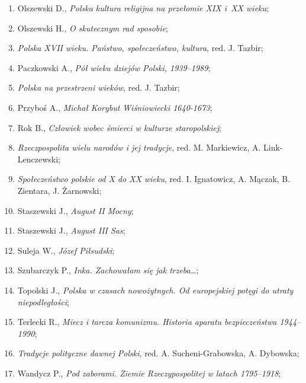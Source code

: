 \documentclass[a4paper,11pt]{article}
\begin{document}
\begin{enumerate}
\item Olszewski D., \textit{Polska kultura religijna na przełomie XIX
    i~XX wieku};

\item Olszewski H., \textit{O skutecznym rad sposobie};

\item \textit{Polska XVII wieku. Państwo, społeczeństwo, kultura}, red.
  J. Tazbir;

\item Paczkowski A., \textit{Pół wieku dziejów Polski, 1939--1989};

\item \textit{Polska na przestrzeni wieków}, red. J. Tazbir;

\item Przyboś A., \textit{Michał Korybut Wiśniowiecki 1640-1673};

\item Rok B., \textit{Człowiek wobec śmierci w kulturze staropolskiej};

\item \textit{Rzeczpospolita wielu narodów i jej tradycje}, red. M.
  Markiewicz, A. Link-Lenczewski;

\item \textit{Społeczeństwo polskie od X do XX wieku}, red. I.
  Ignatowicz, A. Mączak, B. Zientara, J. Żarnowski;

\item Staszewski J., \textit{August II Mocny};

\item Staszewski J., \textit{August III Sas};

\item Suleja W., \textit{Józef Piłsudski};

\item Szubarczyk P., \textit{Inka. Zachowałam się jak trzeba\ldots};

\item Topolski J., \textit{Polska w czasach nowożytnych. Od europejskiej
    potęgi do utraty niepodległości};

\item Terlecki R., \textit{Miecz i tarcza komunizmu. Historia aparatu
    bezpieczeństwa 1944--1990};

\item \textit{Tradycje polityczne dawnej Polski}, red. A.
  Sucheni-Grabowska, A. Dybowska;

\item Wandycz P., \textit{Pod zaborami. Ziemie Rzeczypospolitej w latach
    1795--1918};


\end{enumerate}
\end{document}
